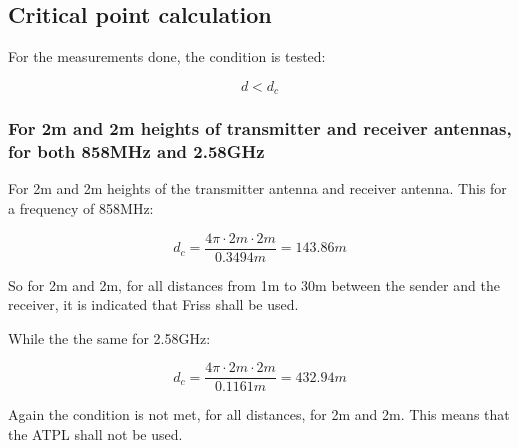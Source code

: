 \subsection{Critical point calculation}
For the measurements done, the condition is tested:

\begin{equation}
d<d_{c}
\label{two_ray_cond_1}
\end{equation}

\subsubsection{For 2m and 2m heights of transmitter and receiver antennas, for both 858MHz and 2.58GHz}

For 2m and 2m heights of the transmitter antenna and receiver antenna. This for a frequency of 858MHz:

\begin{equation}
d_{c} = \frac{4\pi \cdot 2m \cdot 2m}{0.3494m} = 143.86m
\label{critical_fac_dc_calc_2_2_858MHz}
\end{equation}

So for 2m and 2m, for all distances from 1m to 30m between the sender and the receiver, it is indicated that Friss shall be used. 

While the the same for 2.58GHz:

\begin{equation}
d_{c} = \frac{4\pi \cdot 2m \cdot 2m}{0.1161m} = 432.94m
\label{critical_fac_dc_calc_2_2_2.58GHz}
\end{equation}

Again the condition is not met, for all distances, for 2m and 2m. This means that the ATPL shall not be used.





